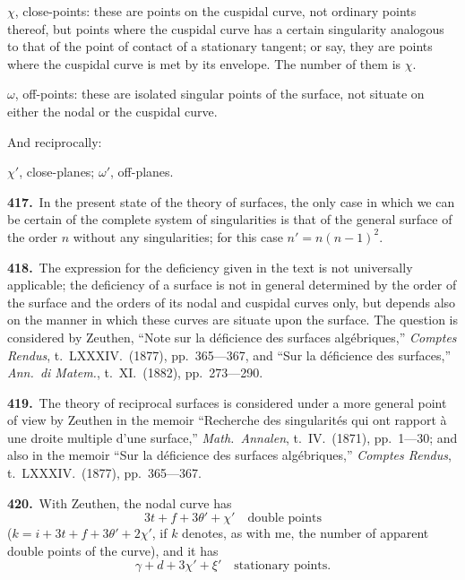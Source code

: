 \documentclass[11pt,a4paper]{article}
\theoremstyle{plain}
\theoremstyle{definition}
\theoremstyle{remark}
\begin{document}
$\chi$, close-points: these are points on the cuspidal curve, not ordinary points thereof, but points where the cuspidal curve has a certain singularity analogous to that of the point of contact of a stationary tangent; or say, they are points where the cuspidal curve is met by its envelope. The number of them is $\chi$.

$\omega$, off-points: these are isolated singular points of the surface, not situate on either the nodal or the cuspidal curve.

And reciprocally:

$\chi'$, close-planes; $\omega'$, off-planes.

\smallskip

\noindent\textbf{417.}\ In the present state of the theory of surfaces, the only case in which we can be certain of the complete system of singularities is that of the general surface of the order $n$ without any singularities; for this case $n'=n(n-1)^2$.

\smallskip

\noindent\textbf{418.}\ The expression for the deficiency given in the text is not universally applicable; the deficiency of a surface is not in general determined by the order of the surface and the orders of its nodal and cuspidal curves only, but depends also on the manner in which these curves are situate upon the surface. The question is considered by Zeuthen, ``Note sur la d\'{e}ficience des surfaces alg\'{e}briques,'' \textit{Comptes Rendus}, t.~LXXXIV.\ (1877), pp.~365---367, and ``Sur la d\'{e}ficience des surfaces,'' \textit{Ann.\ di Matem.}, t.~XI.\ (1882), pp.~273---290.

\smallskip

\noindent\textbf{419.}\ The theory of reciprocal surfaces is considered under a more general point of view by Zeuthen in the memoir ``Recherche des singularit\'{e}s qui ont rapport \`{a} une droite multiple d'une surface,'' \textit{Math.\ Annalen}, t.~IV.\ (1871), pp.~1---30; and also in the memoir ``Sur la d\'{e}ficience des surfaces alg\'{e}briques,'' \textit{Comptes Rendus}, t.~LXXXIV.\ (1877), pp.~365---367.

\newpage
\setcounter{page}{625}

\smallskip

\noindent\textbf{420.}\ With Zeuthen, the nodal curve has
\[
3t+f+3\theta'+\chi'\quad\text{double points}
\]
($k=i+3t+f+3\theta'+2\chi'$, if $k$ denotes, as with me, the number of apparent double points of the curve), and it has
\[
\gamma+d+3\chi'+\xi'\quad\text{stationary points.}
\]
\end{document}
